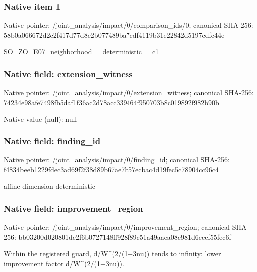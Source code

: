 \documentclass[10pt,a4paper]{article}
\begin{document}
\subsubsection{Native item 1}
Native pointer: /joint\_\allowbreak{}analysis/impact/0/comparison\_\allowbreak{}ids/0; canonical SHA-256: 58b0a066672d2c2f417d77d8e2b077489ba7cdf4119b31e22842d5197cdfc44e

\begingroup\raggedright\sloppy SO\_\allowbreak{}ZO\_\allowbreak{}E07\_\allowbreak{}neighborhood\_\allowbreak{}\_\allowbreak{}deterministic\_\allowbreak{}\_\allowbreak{}c1\par\endgroup

\subsubsection{Native field: extension\_\allowbreak{}witness}
Native pointer: /joint\_\allowbreak{}analysis/impact/0/extension\_\allowbreak{}witness; canonical SHA-256: 74234e98afe7498fb5daf1f36ac2d78acc339464f950703b8c019892f982b90b

Native value (null): null

\subsubsection{Native field: finding\_\allowbreak{}id}
Native pointer: /joint\_\allowbreak{}analysis/impact/0/finding\_\allowbreak{}id; canonical SHA-256: f4834beeb1229fdec3ad69f2f38d89b67ae7b57ecbac4d19fec5c78904cc96c4

\begingroup\raggedright\sloppy affine-dimension-deterministic\par\endgroup

\subsubsection{Native field: improvement\_\allowbreak{}region}
Native pointer: /joint\_\allowbreak{}analysis/impact/0/improvement\_\allowbreak{}region; canonical SHA-256: bb03200d020801dc2f6b0727148ff928f89c51a49aaea08c981d6ecef55fec6f

\begingroup\raggedright\sloppy Within the registered guard,\allowbreak{} d/\allowbreak{}W\textasciicircum{}(2/\allowbreak{}(1+3nu)) tends to infinity:\allowbreak{} lower improvement factor d/\allowbreak{}W\textasciicircum{}(2/\allowbreak{}(1+3nu)).\par\endgroup
\end{document}
